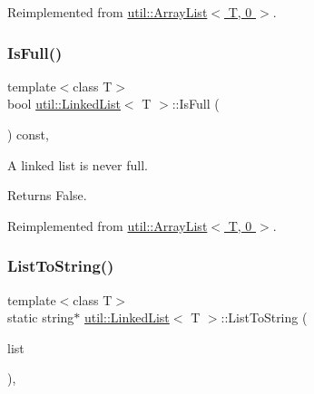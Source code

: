 Reimplemented from \hyperlink{classutil_1_1ArrayList_a8e33bd4f9e6a67140696cf24b8cc66b1}{util\+::\+Array\+List$<$ T, 0 $>$}.

\mbox{\label{classutil_1_1LinkedList_aea5cd5b77e721fc152985904e391fc6d}} 
\subsubsection{\texorpdfstring{Is\+Full()}{IsFull()}}
{\footnotesize\ttfamily template$<$class T$>$ \\
bool \hyperlink{classutil_1_1LinkedList}{util\+::\+Linked\+List}$<$ T $>$\+::Is\+Full (\begin{DoxyParamCaption}{ }\end{DoxyParamCaption}) const\hspace{0.3cm}{\ttfamily [inline]}, {\ttfamily [virtual]}}



A linked list is never full. 

\begin{DoxyReturn}{Returns}
False. 
\end{DoxyReturn}


Reimplemented from \hyperlink{classutil_1_1ArrayList_a09c81f9117f52503ee49e335c44fdd63}{util\+::\+Array\+List$<$ T, 0 $>$}.

\mbox{\label{classutil_1_1LinkedList_a712945761054fdafd091b40bb5772003}} 
\subsubsection{\texorpdfstring{List\+To\+String()}{ListToString()}}
{\footnotesize\ttfamily template$<$class T$>$ \\
static string$\ast$ \hyperlink{classutil_1_1LinkedList}{util\+::\+Linked\+List}$<$ T $>$\+::List\+To\+String (\begin{DoxyParamCaption}\item[{\hyperlink{classutil_1_1LinkedList}{Linked\+List}$<$ string $>$ \&}]{list }\end{DoxyParamCaption})\hspace{0.3cm}{\ttfamily [inline]}, {\ttfamily [static]}}



